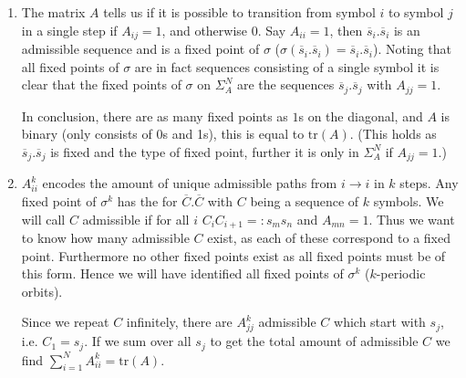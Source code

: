 \begin{solution}[7.5]
\begin{enumerate}
	\item The matrix $A$ tells us if it is possible to transition from symbol $i$ to symbol $j$ in a single step if $A_{ij}=1$, and otherwise 0. Say $A_{ii}=1$, then $\overline{s}_i.\overline{s}_i$ is an admissible sequence and is a fixed point of $\sigma$ ($\sigma\left( \overline{s}_i. \overline{s}_i\right) =\overline{s}_i. \overline{s}_i$). Noting that all fixed points of $\sigma$ are in fact sequences consisting of a single symbol it is clear that the fixed points of $\sigma$ on $\Sigma_{A}^{N}$ are the sequences $\overline{s}_j. \overline{s}_j$ with $A_{j j}=1$.
	
		In conclusion, there are as many fixed points as $1 $s on the diagonal, and $A$ is binary (only consists of 0s and 1s), this is equal to $ \textrm{tr} (A)$. (This holds as $\overline{s}_j. \overline{s}_j$ is fixed and the type of fixed point, further it is only in $\Sigma_{A}^{N}$ if $A_{j j}=1$.)

	\item $A_{ii}^{k}$ encodes the amount of unique admissible paths from $i \to i$ in $k$ steps. Any fixed point of $\sigma^k$ has the for $\overline{C}.\overline{C} $ with $C$ being a sequence of $k$ symbols. We will call $C$ admissible if for all $i$ $C_i C_{i+1} =: s_m s_n$ and $A_{mn}=1$. Thus we want to know how many admissible $C$ exist, as each of these correspond to a fixed point. Furthermore no other fixed points exist as all fixed points must be of this form. Hence we will have identified all fixed points of $\sigma^{k}$ ($k$-periodic orbits).

		Since we repeat $C$ infinitely, there are $A_{j j}^{k}$ admissible $C$ which start with $s_j$, i.e. $C_1 = s_j$. If we sum over all $s_j$ to get the total amount of admissible $C$ we find $\sum_{i=1}^{N} A_{ii}^{k}= \textrm{tr} (A)$.
\end{enumerate}
\end{solution}

